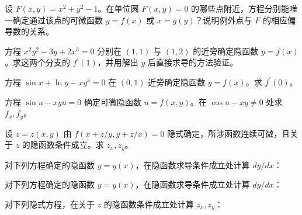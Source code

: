 \noindent\begin{minipage}{\textwidth}
设 $F(x,y)=x^2+y^2-1$。在单位圆 $F(x,y)=0$ 的哪些点附近，方程分别能唯一确定通过该点的可微函数 $y=f(x)$ 或 $x=g(y)$？说明例外点与 $F$ 的相应偏导数的关系。
\end{minipage}\par\vfill
\noindent\begin{minipage}{\textwidth}
方程 $x^2y^2-3y+2x^3=0$ 分别在 $(1,1)$ 与 $(1,2)$ 的近旁确定隐函数 $y=f(x)$。求这两个分支的 $f^{\prime}(1)$，并用解出 $y$ 后直接求导的方法验证。
\end{minipage}\par\vfill
\newpage
\noindent\begin{minipage}{\textwidth}
方程 $\sin x+\ln y-xy^3=0$ 在 $(0,1)$ 近旁确定隐函数 $y=f(x)$。求 $f^{\prime}(0)$。
\end{minipage}\par\vfill
\noindent\begin{minipage}{\textwidth}
方程 $\sin u-xyu=0$ 确定可微隐函数 $u=f(x,y)$。在 $\cos u-xy\ne0$ 处求 $f_x,f_y$。
\end{minipage}\par\vfill
\noindent\begin{minipage}{\textwidth}
设 $z=z(x,y)$ 由 $f(x+z/y,y+z/x)=0$ 隐式确定，所涉函数连续可微，且关于 $z$ 的隐函数条件成立。求 $z_x,z_y$。
\end{minipage}\par\vfill
\newpage
\noindent\begin{minipage}{\textwidth}
对下列方程确定的隐函数 $y=y(x)$，在隐函数求导条件成立处计算 $dy/dx$：
\end{minipage}\par\vfill
\noindent\begin{minipage}{\textwidth}
对下列方程确定的隐函数 $y=y(x)$，在隐函数求导条件成立处计算 $dy/dx$：
\end{minipage}\par\vfill
\noindent\begin{minipage}{\textwidth}
对下列隐式方程，在关于 $z$ 的隐函数条件成立处计算 $z_x,z_y$：
\end{minipage}\par\vfill
